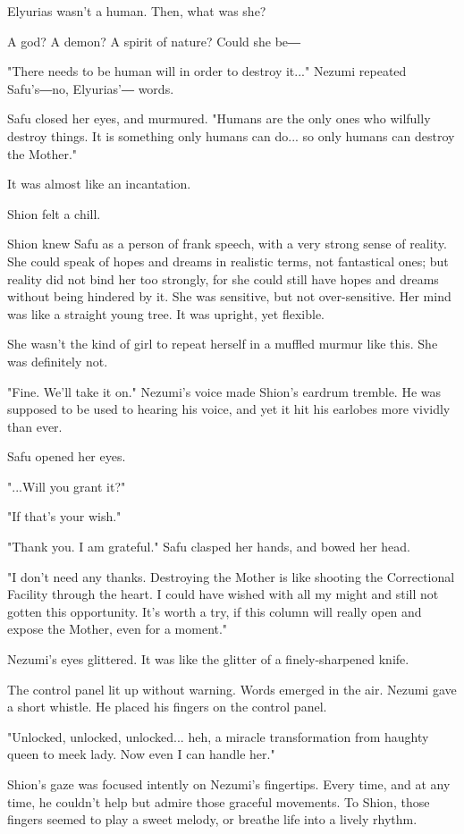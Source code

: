 Elyurias wasn't a human. Then, what was she?

A god? A demon? A spirit of nature? Could she be―

"There needs to be human will in order to destroy it..." Nezumi repeated
Safu's―no, Elyurias'― words.

Safu closed her eyes, and murmured. "Humans are the only ones who
wilfully destroy things. It is something only humans can do... so only
humans can destroy the Mother."

It was almost like an incantation.

Shion felt a chill.

Shion knew Safu as a person of frank speech, with a very strong sense of
reality. She could speak of hopes and dreams in realistic terms, not
fantastical ones; but reality did not bind her too strongly, for she
could still have hopes and dreams without being hindered by it. She was
sensitive, but not over-sensitive. Her mind was like a straight young
tree. It was upright, yet flexible.

She wasn't the kind of girl to repeat herself in a muffled murmur like
this. She was definitely not.

"Fine. We'll take it on." Nezumi's voice made Shion's eardrum tremble.
He was supposed to be used to hearing his voice, and yet it hit his
earlobes more vividly than ever.

Safu opened her eyes.

"...Will you grant it?"

"If that's your wish."

"Thank you. I am grateful." Safu clasped her hands, and bowed her head.

"I don't need any thanks. Destroying the Mother is like shooting the
Correctional Facility through the heart. I could have wished with all my
might and still not gotten this opportunity. It's worth a try, if this
column will really open and expose the Mother, even for a moment."

Nezumi's eyes glittered. It was like the glitter of a finely-sharpened
knife.

The control panel lit up without warning. Words emerged in the air.
Nezumi gave a short whistle. He placed his fingers on the control panel.

"Unlocked, unlocked, unlocked... heh, a miracle transformation from
haughty queen to meek lady. Now even I can handle her."

Shion's gaze was focused intently on Nezumi's fingertips. Every time,
and at any time, he couldn't help but admire those graceful movements.
To Shion, those fingers seemed to play a sweet melody, or breathe life
into a lively rhythm.

